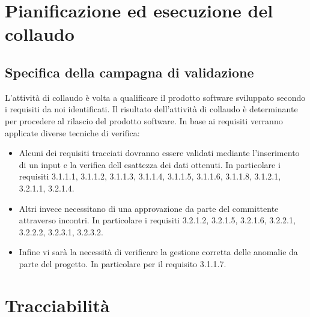 \documentclass[11pt,titlepage,a4paper]{report}
\begin{document}
\chapter{Pianificazione ed esecuzione del collaudo}
\section{Specifica della campagna di validazione}
L'attivit\`a di collaudo \`e volta a qualificare il prodotto software sviluppato secondo i requisiti da noi identificati. Il risultato dell'attivit\`a di collaudo \`e determinante per procedere al rilascio del prodotto software. In base ai requisiti verranno applicate diverse tecniche di verifica:
\begin{itemize}
\item Alcuni dei requisiti tracciati dovranno essere validati mediante l'inserimento di un input e la verifica dell esattezza dei dati ottenuti. In particolare i requisiti 3.1.1.1, 3.1.1.2, 3.1.1.3, 3.1.1.4, 3.1.1.5, 3.1.1.6, 3.1.1.8, 3.1.2.1, 3.2.1.1, 3.2.1.4.
\item Altri invece necessitano di una approvazione da parte del committente attraverso incontri. In particolare i requisiti 3.2.1.2, 3.2.1.5, 3.2.1.6, 3.2.2.1, 3.2.2.2, 3.2.3.1, 3.2.3.2.
\item Infine vi sar\`a la necessit\`a di verificare la gestione corretta delle anomalie da parte del progetto. In particolare per il requisito 3.1.1.7.
\end{itemize}
\chapter{Tracciabilit\`a}
\end{document}
